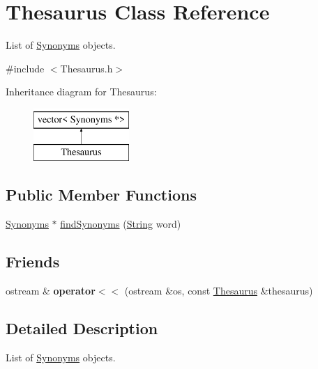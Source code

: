 \hypertarget{classThesaurus}{}\section{Thesaurus Class Reference}
\label{classThesaurus}


List of \mbox{\hyperlink{classSynonyms}{Synonyms}} objects.  




{\ttfamily \#include $<$Thesaurus.\+h$>$}

Inheritance diagram for Thesaurus\+:\begin{figure}[H]
\begin{center}
\leavevmode
\includegraphics[height=2.000000cm]{classThesaurus}
\end{center}
\end{figure}
\subsection*{Public Member Functions}
\begin{DoxyCompactItemize}
\item 
\mbox{\hyperlink{classSynonyms}{Synonyms}} $\ast$ \mbox{\hyperlink{classThesaurus_ab21a3efabe41ac712734cbcc6d7d4414}{find\+Synonyms}} (\mbox{\hyperlink{classString}{String}} word)
\end{DoxyCompactItemize}
\subsection*{Friends}
\begin{DoxyCompactItemize}
\item 
\mbox{\label{classThesaurus_a8cd7efb378b35ca92645c98c8164314b}} 
ostream \& {\bfseries operator$<$$<$} (ostream \&os, const \mbox{\hyperlink{classThesaurus}{Thesaurus}} \&thesaurus)
\end{DoxyCompactItemize}


\subsection{Detailed Description}
List of \mbox{\hyperlink{classSynonyms}{Synonyms}} objects. 

